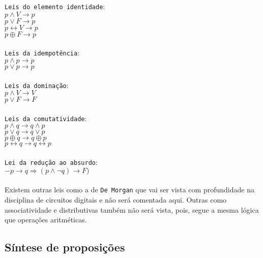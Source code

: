 \documentclass[12pt, onecolumn]{article}
\begin{document}
	\texttt{Leis do elemento identidade}:\\
	$p \land V \rightarrow p$\\
	$p \lor F \rightarrow p$\\
	$p \leftrightarrow V \rightarrow p$\\
	$p \oplus F \rightarrow p$\\	
	\\
	\texttt{Leis da idempotência}:\\
	$p \land p \rightarrow p$\\
	$p \lor p \rightarrow p$\\
	\\
	\texttt{Leis da dominação}:\\
	$p \land V \rightarrow V$\\
	$p \lor F \rightarrow F$\\
	\\
	\texttt{Leis da comutatividade}:\\
	$p \land q \rightarrow q \land p$\\
	$p \lor q \rightarrow q \lor p$\\
	$p \oplus q \rightarrow q \oplus p$\\
	$p \leftrightarrow q \rightarrow q \leftrightarrow p$\\
	\\
	\texttt{Lei da redução ao absurdo}:\\
	$ -p \longrightarrow q \Rightarrow (p \land \lnot q) \longrightarrow F)$\\
	\\
	
	Existem outras leis como a de \texttt{De Morgan} que vai ser vista com
	profundidade na disciplina de circuitos digitais e não será comentada aqui.
	Outras como associatividade e distributivas também não será vista, pois, 
	segue a mesma lógica que operações aritméticas.

		\subsection{Síntese de proposições}
\end{document}
